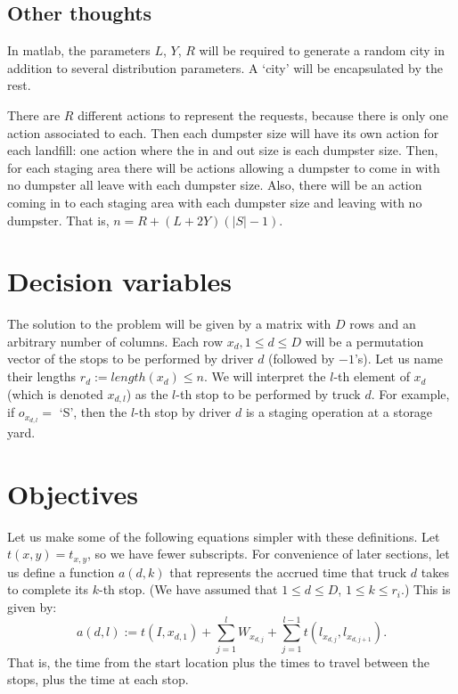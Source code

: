 \documentclass{article}
\begin{document}
\subsection{Other thoughts}

In matlab, the parameters 
  $L$,
  $Y$,
  $R$
will be required to generate a random city in addition to several distribution parameters.
A `city' will be encapsulated by the rest.

There are $R$ different actions to represent the requests, because there is only one action associated to each.
Then each dumpster size will have its own action for each landfill: one action where the in and out size is each dumpster size.
Then, for each staging area there will be actions allowing a dumpster to come in with no dumpster all leave with each dumpster size.
Also, there will be an action coming in to each staging area with each dumpster size and leaving with no dumpster.
That is, $n = R + (L + 2 Y) (|S| - 1)$.

\section{Decision variables}

The solution to the problem will be given by a matrix with $D$ rows and an arbitrary number of columns.
Each row $x_d, 1 \le d \le D$ will be a permutation vector of the stops to be performed by driver $d$ (followed by $-1$'s).
Let us name their lengths $r_d := length(x_d) \le n$.
We will interpret the $l$-th element of $x_{d}$ (which is denoted $x_{d,l}$) as the $l$-th stop to be performed by truck $d$.
For example, if $o_{x_{d,l}} =$ `S', then the $l$-th stop by driver $d$ is a staging operation at a storage yard.

\section{Objectives}

Let us make some of the following equations simpler with these definitions.
Let $t(x,y) = t_{x,y}$, so we have fewer subscripts.
For convenience of later sections, let us define a function $a(d, k)$ that represents the accrued time that truck $d$ takes to complete its $k$-th stop.
(We have assumed that $1 \le d \le D$, $1 \le k \le r_i$.)
This is given by:
$$a(d,l) := t(I, x_{d, 1}) + \sum_{j=1}^{l} W_{x_{d,j}} + \sum_{j=1}^{l-1} t(l_{x_{d,j}},l_{x_{d,j+1}} ).$$
That is, the time from the start location plus the times to travel between the stops, plus the time at each stop.
\end{document}
